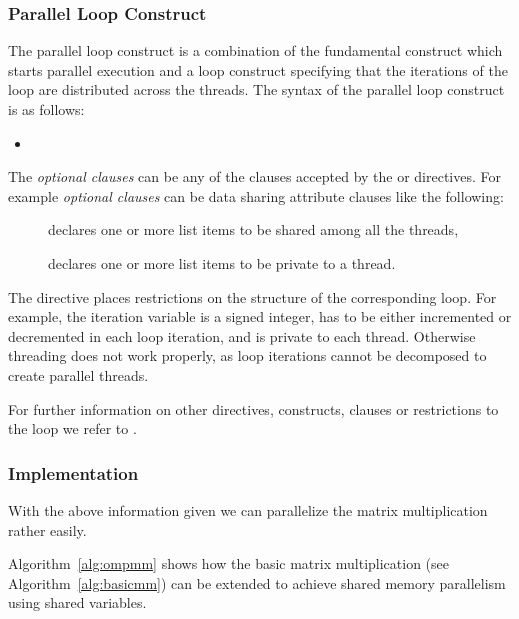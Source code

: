 \subsubsection{Parallel Loop Construct}

The parallel loop construct is a combination of the fundamental
construct \textbf{} which starts parallel execution and
a loop construct specifying that the iterations of the loop are
distributed across the threads. The syntax of the parallel loop
construct  is as follows:

\begin{itemize}
\item {} 
\end{itemize} 

The \textit{optional clauses} can be any of the clauses accepted by the
 or  directives. For
example \textit{optional clauses} can be data sharing attribute
clauses like the following:

\begin{description}
\item[] declares one or more list items to
  be shared among all the threads,
\item[] declares one or more list items
  to be private to a thread.
\end{description}

The  directive places restrictions on the structure
of the corresponding loop. For example, the iteration variable is
a signed integer, has to be either incremented or decremented in each
loop iteration, and is private to each thread. Otherwise threading does
not work properly, as loop iterations cannot be decomposed to create
parallel threads.

For further information on other directives, constructs, clauses or
restrictions to the  loop we refer to \cite{openMP05}.

\subsubsection{Implementation}

With the above information given we can parallelize the matrix
multiplication rather easily.

Algorithm~\ref{alg:ompmm} shows how the basic matrix multiplication
(see Algorithm~\ref{alg:basicmm}) can be extended to achieve shared
memory parallelism using shared variables. 

